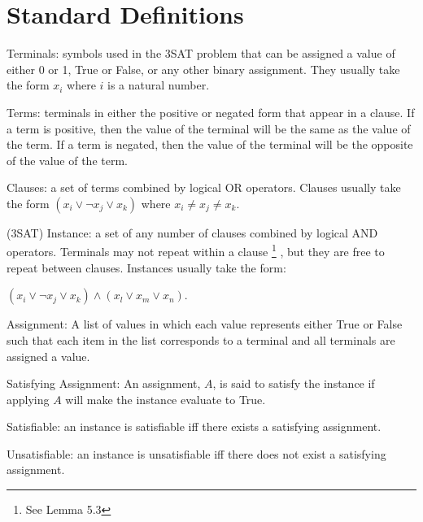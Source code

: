 \documentclass[manuscript]{acmart}
\begin{document}
    \section{Standard Definitions}

    \begin{definition}
        Terminals: symbols used in the 3SAT problem that can be assigned a value
        of either 0 or 1, True or False, or any other binary assignment. They usually
        take the form $x_i$ where $i$ is a natural number.
    \end{definition}
    \begin{definition}
        Terms: terminals in either the positive or negated form that appear in a clause.
        If a term is positive, then the value of the terminal will be the 
        same as the value of the term. If a term is negated, then the value
        of the terminal will be the opposite of the value of the term.
    \end{definition}
    \begin{definition}
        Clauses: a set of terms combined by logical OR operators.
        Clauses usually take the form 
        $(x_i \lor \neg x_j \lor x_k)$ where $x_i \neq x_j \neq x_k$.
    \end{definition}
    \begin{definition}
        (3SAT) Instance: a set of any number of clauses combined by logical
        AND operators. Terminals may not repeat within a clause
        \footnote{See Lemma 5.3}
        , but they are free to repeat between clauses. 
        Instances usually take the form:

        $(x_i \lor \neg x_j \lor x_k) \land (x_l \lor x_m \lor x_n)$.
    \end{definition}
    \begin{definition}
        Assignment: A list of values in which each value represents either True
        or False such that each item in the list corresponds to a terminal and 
        all terminals are assigned a value.
    \end{definition}
    \begin{definition}
        Satisfying Assignment: An assignment, $A$, is said to satisfy the instance if applying $A$ will make the instance evaluate to True.
    \end{definition}
    \begin{definition}
        Satisfiable: an instance is satisfiable iff there exists a satisfying assignment.
    \end{definition}
    \begin{definition}
        Unsatisfiable: an instance is unsatisfiable iff there does not exist a satisfying assignment.
    \end{definition}
\end{document}
